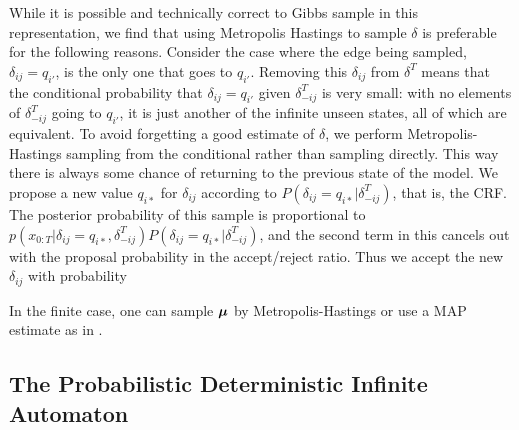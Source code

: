 While it is possible and technically correct to Gibbs sample in this representation, we find that using Metropolis Hastings to sample $\delta$ is preferable for the following reasons. Consider the case where the edge being sampled, $\delta_{ij} = q_{i'}$, is the only one that goes to $q_{i'}$.  Removing this $\delta_{ij}$ from $\delta^T$ means that the conditional probability that $\delta_{ij} = q_{i'}$ given $\delta^T_{-ij}$ is very small: with no elements of $\delta^T_{-ij}$ going to $q_{i'}$, it is just another of the infinite unseen states, all of which are equivalent.  To avoid forgetting a good estimate of $\delta$, we perform Metropolis-Hastings sampling from the conditional rather than sampling directly.  This way there is always some chance of returning to the previous state of the model.  We propose a new value $q_{i*}$ for $\delta_{ij}$ according to $P(\delta_{ij} = q_{i*}|\delta^T_{-ij})$, that is, the CRF.  The posterior probability of this sample is proportional to $p(x_{0:T}|\delta_{ij}=q_{i*},\delta^T_{-ij})P(\delta_{ij} = q_{i*}|\delta^T_{-ij})$, and the second term in this cancels out with the proposal probability in the accept/reject ratio. Thus we accept the new $\delta_{ij}$ with probability


In the finite case, one can sample $\bmu$ by Metropolis-Hastings or use a MAP estimate as in \cite{Mackay1995}.  
 
 \subsection{The Probabilistic Deterministic Infinite Automaton}
 
